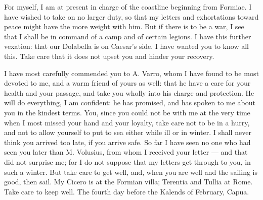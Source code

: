 For myself, I am at present in charge of the coastline beginning from Formiae. I have wished to take on no larger duty, so that my letters and exhortations toward peace might have the more weight with him. But if there is to be a war, I see that I shall be in command of a camp and of certain legions. I have this further vexation: that our Dolabella is on Caesar's side. I have wanted you to know all this. Take care that it does not upset you and hinder your recovery.

 I have most carefully commended you to A. Varro, whom I have found to be most devoted to me, and a warm friend of yours as well: that he have a care for your health and your passage, and take you wholly into his charge and protection. He will do everything, I am confident: he has promised, and has spoken to me about you in the kindest terms. You, since you could not be with me at the very time when I most missed your hand and your loyalty, take care not to be in a hurry, and not to allow yourself to put to sea either while ill or in winter. I shall never think you arrived too late, if you arrive safe. So far I have seen no one who had seen you later than M. Volusius, from whom I received your letter --- and that did not surprise me; for I do not suppose that my letters get through to you, in such a winter. But take care to get well, and, when you are well and the sailing is good, then sail. My Cicero is at the Formian villa; Terentia and Tullia at Rome. Take care to keep well. The fourth day before the Kalends of February, Capua.

